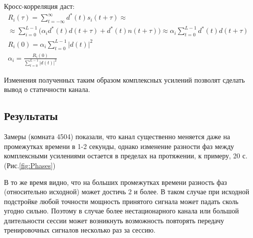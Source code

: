 \documentclass[a4paper,12pt,oneside]{scrartcl}
\begin{document}
Кросс-корреляция даст:
\begin{gather}
R_i\left(\tau\right) = \sum\limits_{t=-\infty}^{\infty}d^*\left(t\right)s_i\left(t+\tau\right) \approx \nonumber \\ 
\approx \sum\limits_{i=0}^{L-1}\bigl(\alpha_i d^*\left(t\right)d\left(t+\tau\right)+d^*\left(t\right)n\left(t+\tau\right)\bigr) \approx 
\alpha_i\sum\limits_{t=0}^{L-1} d^*\left(t\right)d\left(t+\tau\right) \\
R_i\left(0\right) = \alpha_i\sum\limits_{t=0}^{L-1}|d\left(t\right)|^2 \\
\alpha_i = \frac{R_i\left(0\right)}{\sum\limits_{t=0}^{L-1}|d\left(t\right)|^2}
\label{eq:Crosscor}
\end{gather}

Изменения полученных таким образом комплексных усилений позволят сделать вывод о статичности канала.
\subsection{Результаты}
Замеры (комната 4504) показали, что канал существенно меняется даже на промежутках времени в 1-2 секунды, однако изменение разности фаз между комплексными усилениями остается в пределах на протяжении, к примеру, 20 с. (Рис.\ref{fig:Phases})

В то же время видно, что на больших промежутках времени разность фаз (относительно исходной) может достичь 2 и более. В таком случае при исходной подстройке любой точности мощность принятого сигнала может падать сколь угодно сильно. 
Поэтому в случае более нестационарного канала или большой длительности сессии может возникнуть возможность повторять передачу тренировочных сигналов несколько раз за сессию.
\end{document}
